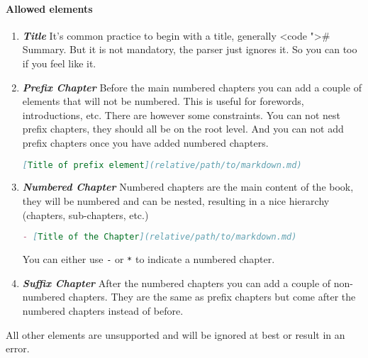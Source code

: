 \documentclass{article}
\begin{document}
\paragraph{Allowed elements}
\label{Allowed elements}
\label{allowed-elements}
\begin{enumerate}
\item 
\emph{\textbf{Title}} It's common practice to begin with a title, generally <code
  ">\# Summary. But it is not mandatory, the
parser just ignores it. So you can too if you feel like it.\\

\item 
\emph{\textbf{Prefix Chapter}} Before the main numbered chapters you can add a couple
of elements that will not be numbered. This is useful for forewords,
introductions, etc. There are however some constraints. You can not nest
prefix chapters, they should all be on the root level. And you can not add
prefix chapters once you have added numbered chapters.\\
\begin{lstlisting}[language=markdown]
[Title of prefix element](relative/path/to/markdown.md)

\end{lstlisting}

\item 
\emph{\textbf{Numbered Chapter}} Numbered chapters are the main content of the book,
they will be numbered and can be nested, resulting in a nice hierarchy
(chapters, sub-chapters, etc.)\\
\begin{lstlisting}[language=markdown]
- [Title of the Chapter](relative/path/to/markdown.md)

\end{lstlisting}

You can either use \lstinline|-| or \lstinline|*| to indicate a numbered chapter.\\

\item 
\emph{\textbf{Suffix Chapter}} After the numbered chapters you can add a couple of
non-numbered chapters. They are the same as prefix chapters but come after
the numbered chapters instead of before.\\

\end{enumerate}

All other elements are unsupported and will be ignored at best or result in an
error.\\
\end{document}
